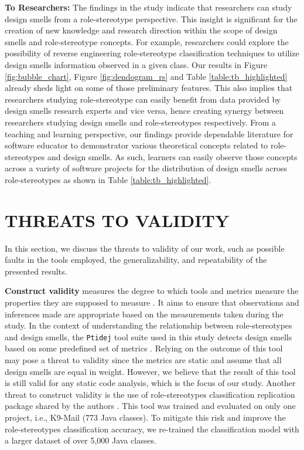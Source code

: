 \documentclass[AMA,Times1COL]{WileyNJDv5} %
\begin{document}
	\textbf{To Researchers:}
	The findings in the study indicate that researchers can study design smells from a role-stereotype perspective. This insight is significant for the creation of new knowledge and research direction within the scope of design smells and role-stereotype concepts. For example, researchers could explore the possibility of reverse engineering role-stereotype classification techniques to utilize design smells information observed in a given class. 
	Our results in Figure \ref{fig:bubble_chart}, Figure \ref{fig:dendogram_rs} and Table \ref{table:tb_highlighted} already sheds light on some of those preliminary features. This also implies that researchers studying role-stereotype can easily benefit from data provided by design smells research experts and vice versa, hence creating synergy between researchers studying design smells and role-stereotypes respectively. From a teaching and learning perspective, our findings provide dependable literature for software educator to demonstrator various theoretical concepts related to role-stereotypes and design smells. As such, learners can easily observe those concepts across a variety of software projects for the distribution of design smells across role-stereotypes as shown in Table \ref{table:tb_highlighted}.
	
	\section{THREATS TO VALIDITY}\label{sec:threats}
	In this section, we discuss the threats to validity of our work, such as possible faults in the tools employed, the generalizability, and repeatability of the presented results.
	
	\textbf{Construct validity} measures the degree to which tools and metrics measure the properties they are supposed to measure \cite{sharma2021code}. It aims to ensure that observations and inferences made are appropriate based on the measurements taken during the study. In the context of understanding the relationship between role-stereotypes and design smells, the {\tt Ptidej} tool suite used in this study detects design smells based on some predefined set of metrics \cite{ogenrwot}. Relying on the outcome of this tool may pose a threat to validity since the metrics are static and assume that all design smells are equal in weight. However, we believe that the result of this tool is still valid for any static code analysis, which is the focus of our study. Another threat to construct validity is the use of  role-stereotypes classification replication package shared by the authors \cite{nurwidyantoro2019automated}. This tool was trained and evaluated on only one project, i.e., K9-Mail (773 Java classes). To mitigate this risk and improve the role-stereotypes classification accuracy, we re-trained the classification model with a larger dataset of over 5,000 Java classes.
	
\end{document}
